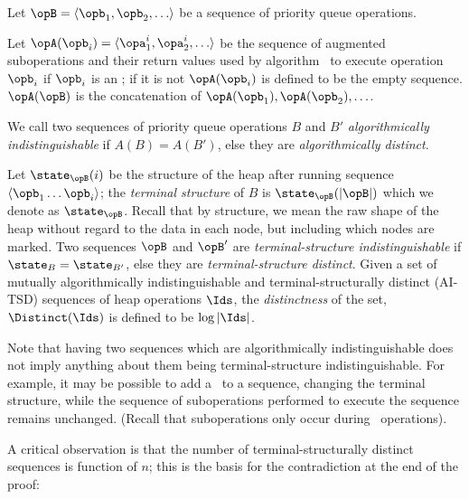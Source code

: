 Let $\opB=\langle \opb_1, \opb_2, \ldots \rangle$   be a sequence of priority queue operations.
\begin{fullonly}

\end{fullonly}
Let $\opA(\opb_i)=\langle \opa^i_1, \opa^i_2, \ldots \rangle$ be the sequence of augmented suboperations and their return values used by algorithm \alg\ to execute operation $\opb_i$ if $\opb_i$ is an \opEm ; if it is not $\opA(\opb_i)$ is defined to be the empty sequence. $\opA(\opB)$ is the concatenation of $\opA(\opb_1), \opA(\opb_2), \ldots$.
\begin{fullonly}

\end{fullonly}
We call two sequences of priority queue operations $B$ and $B'$ \emph{algorithmically indistinguishable} if $A(B) =A(B')$, else they are \emph{algorithmically distinct}.
\begin{fullonly}

\end{fullonly}
Let $\state_{\opB}(i)$ be the structure of the heap after running sequence $\langle \opb_1\ldots \opb_i\rangle$; the \emph{terminal structure} of $B$ is $\state_{\opB}(|\opB|)$ which we denote as $\state_{\opB}$. Recall that by structure, we mean the raw shape of the heap without regard to the data in each node, but including which nodes are marked. Two sequences $\opB$ and $\opB'$ are \emph{terminal-structure indistinguishable} if $\state_B = \state_{B'}$, else they are \emph{terminal-structure distinct}.
Given a set of mutually algorithmically indistinguishable and terminal-structurally distinct (AI-TSD) sequences of heap operations $\Ids$, the \emph{distinctness} of the set, $\Distinct(\Ids)$ is defined to be $\log |\Ids|$. 
\begin{fullonly}

\end{fullonly}
{Note that having two sequences which are algorithmically indistinguishable does not imply anything about them being terminal-structure indistinguishable. For example, it may be possible to add a \opDc\ to a sequence, changing the terminal structure, while the sequence of suboperations performed to execute the sequence remains unchanged. (Recall that suboperations only occur during \opEm\ operations).}
\begin{fullonly}

\end{fullonly}
A critical observation is that the number of terminal-structurally distinct sequences is function of $n$; this is the basis for the contradiction at the end of the proof:

